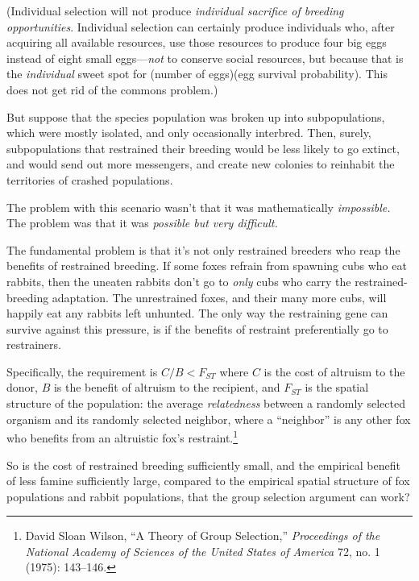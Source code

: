 {{
 (Individual selection will not produce \textit{individual
sacrifice of breeding opportunities}. Individual selection can
certainly produce individuals who, after acquiring all available
resources, use those resources to produce four big eggs instead of
eight small eggs---\textit{not} to conserve social resources, but
because that is the \textit{individual} sweet spot for (number of
eggs){\texttimes}(egg survival probability). This does not get rid of
the commons problem.)}

{
 But suppose that the species population was broken up into
subpopulations, which were mostly isolated, and only occasionally
interbred. Then, surely, subpopulations that restrained their breeding
would be less likely to go extinct, and would send out more messengers,
and create new colonies to reinhabit the territories of crashed
populations.}

{
 The problem with this scenario wasn't that it was
mathematically \textit{impossible.} The problem was that it was
\textit{possible but very difficult.}}

{
 The fundamental problem is that it's not only
restrained breeders who reap the benefits of restrained breeding. If
some foxes refrain from spawning cubs who eat rabbits, then the uneaten
rabbits don't go to \textit{only} cubs who carry the
restrained-breeding adaptation. The unrestrained foxes, and their many
more cubs, will happily eat any rabbits left unhunted. The only way the
restraining gene can survive against this pressure, is if the benefits
of restraint preferentially go to restrainers.}

{
 Specifically, the requirement is $C/B <
F_{ST}$ where $C$ is the cost of altruism to the donor, $B$ is
the benefit of altruism to the recipient, and $F_{ST}$ is
the spatial structure of the population: the average
\textit{relatedness} between a randomly selected organism and its
randomly selected neighbor, where a
``neighbor'' is any other fox who
benefits from an altruistic fox's
restraint.\footnote{David Sloan Wilson, ``A Theory of Group
Selection,'' \textit{Proceedings of the National
Academy of Sciences of the United States of America} 72, no. 1 (1975):
143--146.}}

{
 So is the cost of restrained breeding sufficiently small, and the
empirical benefit of less famine sufficiently large, compared to the
empirical spatial structure of fox populations and rabbit populations,
that the group selection argument can work?}

}
